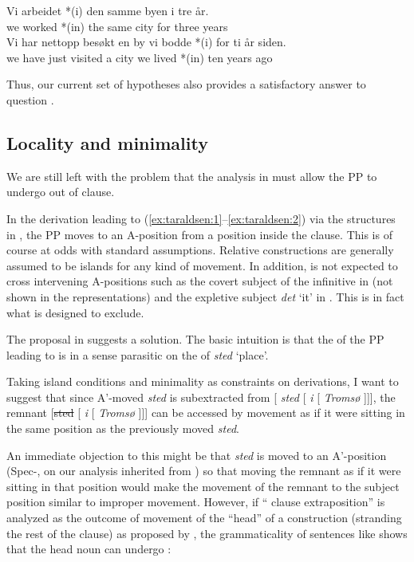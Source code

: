 \documentclass[output=paper]{LSP/langsci}
\begin{document}
\ea%
    \label{ex:taraldsen:57}
  \ea
\gll   Vi arbeidet *(i) den samme byen  i tre år.\\
          we worked *(in) the same city     for three years\\
\ex
\gll    Vi har nettopp besøkt en by vi bodde *(i) for ti år siden.\\
           we have just    visited a  city we lived *(in)  ten years ago \\
\z
\z

Thus, our current set of hypotheses also provides a satisfactory answer to question .

\subsection{ Locality and minimality}\label{sec:taraldsen:4.5}

We are still left with the problem that the analysis in  must allow the PP to undergo  out of  clause.

In the derivation leading to (\ref{ex:taraldsen:1}--\ref{ex:taraldsen:2}) via the structures in , the PP moves to an A-position from a position inside the  clause. This is of course at odds with standard assumptions. Relative constructions are generally assumed to be islands for any kind of movement. In addition,  is not expected to cross intervening A-positions such as the covert subject of the infinitive in  (not shown in the representations) and the expletive subject \textit{det} `it' in . This is in fact what  is designed to exclude.

The proposal in  suggests a solution. The basic intuition is that the  of the PP leading to  is in a sense parasitic on the  of \textit{sted} `place'.

Taking island conditions and minimality as constraints on derivations, I want to suggest that since A’-moved \textit{sted} is subextracted from [ \textit{sted} [ \textit{i} [ \textit{Tromsø} ]]], the remnant [\st{sted} [ \textit{i} [ \textit{Tromsø} ]]] can be accessed by movement as if it were sitting in the same position as the previously moved \textit{sted}.

An immediate objection to this might be that \textit{sted} is moved to an A’-position (Spec-, on our analysis inherited from \citealt{Kayne1994}) so that moving the remnant as if it were sitting in that position would make the movement of the remnant to the subject position similar to improper movement. However, if “ clause extraposition” is analyzed as the outcome of movement of the “head” of a  construction (stranding the rest of the  clause) as proposed by \citet{Kayne1994}, the grammaticality of sentences like  shows that the head noun can undergo :
\end{document}
